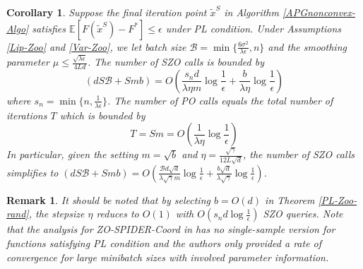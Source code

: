 \documentclass[iicol,sn-basic]{sn-jnl}
\theoremstyle{thmstyleone}%
\theoremstyle{thmstyletwo}%
\newtheorem{remark}{Remark}%
\theoremstyle{thmstylethree}%
\newcommand*{\E}{\mathbb{E}}
\newtheorem{corollary}[theorem]{Corollary}
\begin{document}
\begin{corollary}\label{PL-Zo-Cor-rand}
Suppose the final iteration point $\tilde{x}^S$ in Algorithm \ref{APGnonconvex-Algo} satisfies $\E[F(\tilde{x}^S) - F^*]\leq \epsilon$ under PL condition. Under Assumptions \ref{Lip-Zoo} and \ref{Var-Zoo}, we let batch size $\mathcal{B} = \min\{\frac{6\sigma^2}{\lambda\epsilon},n\}$ and the smoothing parameter $\mu \leq \frac{\sqrt{\lambda\epsilon}}{4 L d}$. The number of SZO calls is bounded by
\[
(dS\mathcal{B}+Smb) = O(\frac{s_n d}{\lambda\eta m}\log\frac{1}{\epsilon}+\frac{b }{\lambda\eta}\log\frac{1}{\epsilon})
\]
where $s_n = \min \{n,\frac{1}{\lambda \epsilon}\}$.
The number of PO calls equals the total number of iterations $T$ which is bounded by
\[
T = Sm = O(\frac{1}{\lambda\eta}\log\frac{1}{\epsilon})
\]
In particular, given the setting  $m=\sqrt{b}$ and $\eta = \frac{\sqrt{\gamma}}{12 L\sqrt{d}}$, the number of SZO calls  simplifies to 
$(dS\mathcal{B}+Smb) = O(\frac{\mathcal{B}d\sqrt{d}}{\lambda\sqrt{\gamma} m}\log\frac{1}{\epsilon}+\frac{b\sqrt{d}}{\lambda\sqrt{\gamma}}\log\frac{1}{\epsilon})$.
\end{corollary}
\begin{remark}
 It should be noted that by selecting  $b = O(d)$ in Theorem \ref{PL-Zoo-rand}, the stepsize $\eta$ reduces to $O(1)$ with $O(s_n d \log \frac{1}{\epsilon})$ SZO queries. Note that the analysis for ZO-SPIDER-Coord in \cite{ji2019improved} has no single-sample version for functions satisfying PL condition and the authors only provided a rate of convergence for large minibatch sizes with involved parameter information.
\end{remark}
\end{document}
